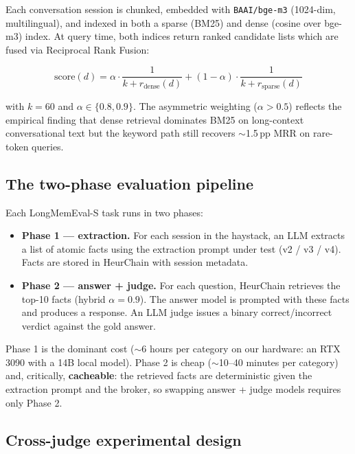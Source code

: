 \documentclass{article}
\begin{document}
Each conversation session is chunked, embedded with \texttt{BAAI/bge-m3} (1024-dim, multilingual), and indexed in both a sparse (BM25) and dense (cosine over bge-m3) index. At query time, both indices return ranked candidate lists which are fused via Reciprocal Rank Fusion:

\begin{equation}
\text{score}(d) = \alpha \cdot \frac{1}{k + r_{\text{dense}}(d)} + (1 - \alpha) \cdot \frac{1}{k + r_{\text{sparse}}(d)}
\label{eq:rrf}
\end{equation}

with $k = 60$ and $\alpha \in \{0.8, 0.9\}$. The asymmetric weighting ($\alpha > 0.5$) reflects the empirical finding that dense retrieval dominates BM25 on long-context conversational text but the keyword path still recovers $\sim$1.5\,pp MRR on rare-token queries.

\subsection{The two-phase evaluation pipeline}

Each LongMemEval-S task runs in two phases:

\begin{itemize}
  \item \textbf{Phase 1 --- extraction.} For each session in the haystack, an LLM extracts a list of atomic facts using the extraction prompt under test (v2 / v3 / v4). Facts are stored in HeurChain with session metadata.
  \item \textbf{Phase 2 --- answer + judge.} For each question, HeurChain retrieves the top-10 facts (hybrid $\alpha = 0.9$). The answer model is prompted with these facts and produces a response. An LLM judge issues a binary correct/incorrect verdict against the gold answer.
\end{itemize}

Phase 1 is the dominant cost ($\sim$6 hours per category on our hardware: an RTX 3090 with a 14B local model). Phase 2 is cheap ($\sim$10--40 minutes per category) and, critically, \textbf{cacheable}: the retrieved facts are deterministic given the extraction prompt and the broker, so swapping answer + judge models requires only Phase 2.

\subsection{Cross-judge experimental design}
\label{sec:crossjudge}
\end{document}
